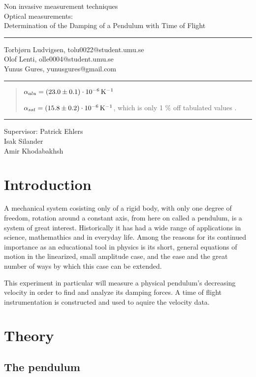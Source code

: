 \documentclass[11pt, a4paper]{article}
\date{\todayswe}
\makeatletter
\def\contacts{Torbjørn Ludvigsen, tolu0022@student.umu.se\\Olof Lenti, olle0004@student.umu.se\\
Yunus Gures, yunusgures@gmail.com}
\def\course{Non invasive measurement techniques}
\def\lab{Optical measurements:\\Determination of the Damping of a Pendulum with Time of Flight}
\def\supervisors{Patrick Ehlers\\Isak Silander\\ Amir Khodabakhsh}
\makeatother
\begin{document}
\pagestyle{fancy}
\begin{titlepage}
	\begin{center}
		\course\\
		\Large{\lab}\vspace{2mm}
		\hrule\vspace{2mm}
		\tiny{\contacts}\vspace{2mm}
		\hrule
	\end{center}
	\vspace{4mm}

	\begin{abstract}

  $\alpha_{alu} =\unit[(23.0 \pm 0.1)\cdot10^{-6}]{K^{-1}}$ 

  $\alpha_{sst} = \unit[(15.8 \pm 0.2)\cdot10^{-6}]{K^{-1}}$, 
    which is only 1 \% off tabulated values \cite{ph, thex}.

	\end{abstract}
	\vfill
	\hrule\vspace{2mm}
	\centering
		\tiny{Supervisor: \supervisors}
\end{titlepage}

\pagestyle{plain}
\vspace{2cm}
\section{Introduction}
A mechanical system cosisting only of a rigid body, with only one degree of 
freedom, rotation around a constant axis, from here on called a pendulum, is 
a system of great interest. Historically it has had a wide range of
applications in science, mathemathics and in everyday life. Among the reasons for
its continued importance as an educational tool in physics is its short, general 
equations of
motion in the linearized, small amplitude case, and the ease and the great number 
of ways by which this case can be extended.

This experiment in particular will measure a physical pendulum's decreasing velocity
in order to find and analyze its damping forces. A time of flight instrumentation
is constructed and used to aquire the velocity data.

\section{Theory}
\subsection{The pendulum}
\end{document}
